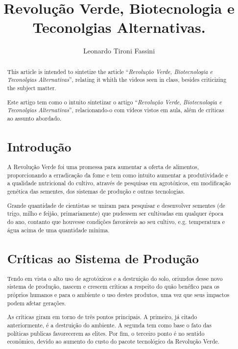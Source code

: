 \documentclass[12pt]{article}
\title{ Revolução Verde, Biotecnologia e Teconolgias Alternativas. }
\author{ Leonardo Tironi Fassini }
\begin{document}
\maketitle

\begin{abstract}
  This article is intended to sintetize the article ``\emph{Revolução Verde, Biotecnologia e Teconolgias Alternativas}''\cite{livro}, relating it whith the videos seen in class, besides criticizing the subject matter.

\begin{resumo}
  Este artigo tem como o intuito sintetizar o artigo ``\emph{Revolução Verde, Biotecnologia e Teconolgias Alternativas}''\cite{livro}, relacionando-o com vídeos vistos em aula, além de críticas ao assunto abordado.
\end{resumo}


\section{ Introdução }

A Revolução Verde foi uma promessa para aumentar a oferta de alimentos, proporcionando a erradicação da fome\cite{albergoni} e tem como intuito aumentar a produtividade e a qualidade nutricional do cultivo, através de pesquisas em agrotóxicos, em modificação genética das sementes, dos sistemas de produção e outras tecnologias\cite{livro}.

Grande quantidade de cientistas se uniram para pesquisar e desenvolver sementes (de trigo, milho e feijão, primariamente) que pudessem ser cultivadas em qualquer época do ano, contanto que houvesse condições favoráveis ao seu cultivo, e.g. temperatura e água acima de uma quantidade mínima.

\section{ Críticas ao Sistema de Produção }

Tendo em vista o alto uso de agrotóxicos e a destruição do solo, oriundos desse novo sistema de produção, nascem e crescem críticas a respeito do quão benéfico para os próprios humanos e para o ambiente o uso destes produtos, uma vez que seus impactos podem afetar gerações.

As críticas giram em torno de três pontos principais. A primeiro, já citado anteriormente, é a destruição do ambiente. A segunda tem como base o fato das políticas publicas favorecerem as elites. Por fim, o terceiro ponto é no sentido econômico, devido ao aumento do custo do pacote tecnológico da Revolução Verde.


\end{abstract}
\end{document}
